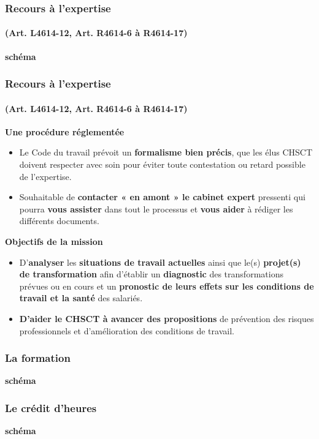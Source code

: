 \documentclass{beamer}
\begin{document}
\begin{frame}
\frametitle{Recours à l’expertise}
\framesubtitle{(Art. L4614-12, Art. R4614-6 à R4614-17)}
\textbf{schéma}
\end{frame}

\begin{frame}
\frametitle{Recours à l’expertise}
\framesubtitle{(Art. L4614-12, Art. R4614-6 à R4614-17)}

\textbf{Une procédure réglementée}

\begin{itemize}
\item Le Code du travail prévoit un \textbf{formalisme bien précis}, que les élus CHSCT doivent respecter avec soin pour éviter toute contestation ou retard possible de l’expertise. 

\item Souhaitable de \textbf{contacter « en amont » le cabinet expert} pressenti qui pourra \textbf{vous assister} dans tout le processus et \textbf{vous aider} à rédiger les différents documents. 
\end{itemize}
\textbf{Objectifs de la mission}

\begin{itemize}
\item D’\textbf{analyser} les \textbf{situations de travail actuelles} ainsi que le(s) \textbf{projet(s) de transformation} afin d’établir un \textbf{diagnostic} des transformations prévues ou en cours et un\textbf{ pronostic de leurs effets sur les conditions de travail et la santé} des salariés.

\item \textbf{D’aider le CHSCT à avancer des propositions} de prévention des risques professionnels et d’amélioration des conditions de travail.
\end{itemize}
\end{frame}

\begin{frame}
\frametitle{La formation}

\textbf{schéma}
\end{frame}


\begin{frame}
\frametitle{Le crédit d’heures}

\textbf{schéma}
\end{frame}
\end{document}
